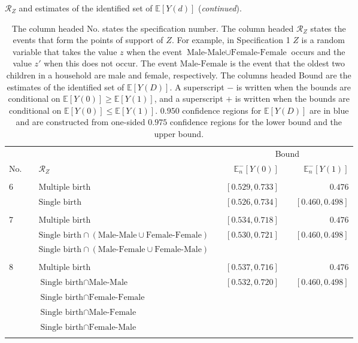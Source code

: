 \documentclass[12pt,a4paper,twoside]{article}
\renewcommand{\baselinestretch}{1.5}
\numberwithin{equation}{section}
\begin{document}
\begin{sidewaystable}[p]
\centering
\caption{$\mathcal{R}_Z$ and estimates of the identified set of $\mathbb{E}[Y(d)]$ (\emph{continued}).}
\begin{tabular}{lclcrcr}
\toprule
&	&  & &\multicolumn{3}{c}{Bound} \\
\cmidrule(r){4-7}	
No. & &	$\mathcal{R}_Z$	&	&	$\mathbb{E}_n^-[Y(0)]$	&	&	$\mathbb{E}_n^-[Y(1)]$\\
\midrule
& &\phantom{$\text{Male-Female}\cup\text{Female-Male}\cup\text{Female-Female}$}\\
6& &$\text{Multiple birth}$&	&	$[0.529,0.733]$	&	&	$0.476$\\
& &$\text{Single birth}$& &\color{blue}$[0.526,0.734]$	&	&	\color{blue}$[0.460,0.498]$\\
\\
7& &$\text{Multiple birth}$&	&	$[0.534,0.718]$	&	&	$0.476$\\
& &$\text{Single birth}\cap(\text{Male-Male}\cup\text{Female-Female})$& &\color{blue}$[0.530,0.721]$	&	&	\color{blue}$[0.460,0.498]$\\
& &$\text{Single birth}\cap(\text{Male-Female}\cup\text{Female-Male})$\\
\\
8& &$\text{Multiple birth}$&	&	$[0.537,0.716]$	&	&	$0.476$\\
& &$\text{Single birth}\cap\text{Male-Male}$& &\color{blue}$[0.532,0.720]$	&	&	\color{blue}$[0.460,0.498]$\\
& &$\text{Single birth}\cap\text{Female-Female}$\\
& &$\text{Single birth}\cap\text{Male-Female}$ \\
& &$\text{Single birth}\cap\text{Female-Male}$\\
	\\
\bottomrule
\end{tabular}
\vspace{10pt}
\renewcommand{\baselinestretch}{1.5}
\caption*{\scriptsize The column headed No. states the specification number. The column headed $\mathcal{R}_Z$ states the events that form the points of support of $Z$. For example, in Specification 1 $Z$ is a random variable that takes the value $z$ when the event $\text{Male-Male}\cup\text{Female-Female}$ occurs and the value $z'$ when this does not occur. The event $\text{Male-Female}$ is the event that the oldest two children in a household are male and female, respectively. The columns headed Bound are the estimates of the identified set of $\mathbb{E}[Y(D)]$. A superscript $-$ is written when the bounds are conditional on $\mathbb{E}[Y(0)]\geq\mathbb{E}[Y(1)]$, and a superscript $+$ is written when the bounds are conditional on $\mathbb{E}[Y(0)]\leq\mathbb{E}[Y(1)]$. $0.950$ confidence regions for $\mathbb{E}[Y(D)]$ are in blue and are constructed from one-sided $0.975$ confidence regions for the lower bound and the upper bound.}
\label{tbl:setsmult}
\end{sidewaystable}
\end{document}
